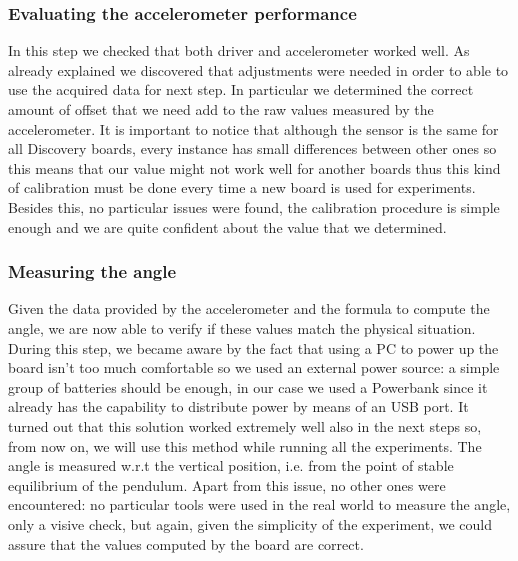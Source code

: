 \subsubsection{Evaluating the accelerometer performance}
In this step we checked that both driver and accelerometer worked well. As already explained we discovered that adjustments were needed in order to able to use the acquired data for next step. In particular we determined the correct amount of offset that we need add to the raw values measured by the accelerometer. It is important to notice that although the sensor is the same for all Discovery boards, every instance has small differences between other ones so this means that our value might not work well for another boards thus this kind of calibration must be done every time a new board is used for experiments. \\ Besides this, no particular issues were found, the calibration procedure is simple enough and we are quite confident about the value that we determined.
\subsubsection{Measuring the angle}
Given the data provided by the accelerometer and the formula to compute the angle, we are now able to verify if these values match the physical situation. During this step, we became aware by the fact that using a PC to power up the board isn't too much comfortable so we used an external power source: a simple group of batteries should be enough, in our case we used a Powerbank since it already has the capability to distribute power by means of an USB port. It turned out that this solution worked extremely well also in the next steps so, from now on, we will use this method while running all the experiments. The angle is measured w.r.t the vertical position, i.e. from the point of stable equilibrium of the pendulum. Apart from this issue, no other ones were encountered: no particular tools were used in the real world to measure the angle, only a visive check, but again, given the simplicity of the experiment, we could assure that the values computed by the board are correct. 
